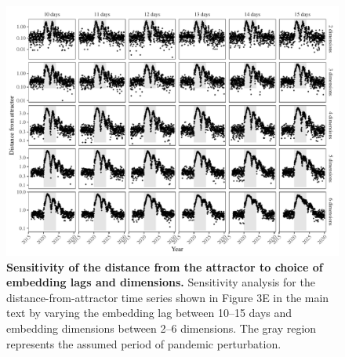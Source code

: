 \documentclass[12pt]{article}
\begin{document}
\begin{figure}[!th]
\includegraphics[width=\textwidth]{../figure3/figure3_sens.pdf}
\caption{
\textbf{Sensitivity of the distance from the attractor to choice of embedding lags and dimensions.}
Sensitivity analysis for the distance-from-attractor time series shown in Figure 3E in the main text by varying the embedding lag between 10--15 days and embedding dimensions between 2--6 dimensions.
The gray region represents the assumed period of pandemic perturbation.
}
\end{figure}

\pagebreak
\end{document}
